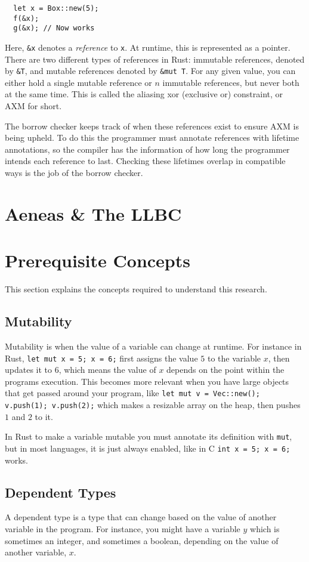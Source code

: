 \documentclass[12pt,twoside]{report}
\begin{document}
\begin{lstlisting}
  let x = Box::new(5);
  f(&x);
  g(&x); // Now works
\end{lstlisting}

Here, \verb|&x| denotes a \textit{reference} to \verb|x|. At runtime, this is represented as a pointer. There are two different types of references in Rust: immutable references, denoted by \verb|&T|, and mutable references denoted by \verb|&mut T|. For any given value, you can either hold a single mutable reference or $n$ immutable references, but never both at the same time. This is called the aliasing xor (exclusive or) constraint, or AXM for short.

The borrow checker keeps track of when these references exist to ensure AXM is being upheld. To do this the programmer must annotate references with lifetime annotations, so the compiler has the information of how long the programmer intends each reference to last. Checking these lifetimes overlap in compatible ways is the job of the borrow checker.


\section{Aeneas \& The LLBC}

\section{Prerequisite Concepts}
\label{prerequisites}
This section explains the concepts required to understand this research.

\subsection{Mutability}
Mutability is when the value of a variable can change at runtime. For instance in Rust, \verb|let mut x = 5; x = 6;| first assigns the value $5$ to the variable $x$, then updates it to $6$, which means the value of $x$ depends on the point within the programs execution. This becomes more relevant when you have large objects that get passed around your program, like \verb|let mut v = Vec::new(); v.push(1); v.push(2);| which makes a resizable array on the heap, then pushes $1$ and $2$ to it.

In Rust to make a variable mutable you must annotate its definition with \verb|mut|, but in most languages, it is just always enabled, like in C \verb|int x = 5; x = 6;| works.

\subsection{Dependent Types}
A dependent type is a type that can change based on the value of another variable in the program. For instance, you might have a variable $y$ which is sometimes an integer, and sometimes a boolean, depending on the value of another variable, $x$.
\end{document}
